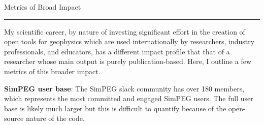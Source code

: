 \documentclass[a4paper, 11pt]{article}
\newcommand{\heading}[1]{
    \begin{minipage}[t]{\textwidth}
    \vspace{0.12cm}
    {\LARGE #1}\\
    \vspace{-0.24cm}
    \hrule
    \end{minipage}
    \vspace{0.05cm}

}
\begin{document}

\heading{Metrics of Broad Impact}

My scientific career, by nature of investing significant effort in the creation of open tools for geophysics which are used internationally by researchers, industry professionals, and educators, has a different impact profile that that of a researcher whose main output is purely publication-based. Here, I outline a few metrics of this broader impact. \vspace{0.3cm}

\textbf{SimPEG user base}: The SimPEG slack community has over 180 members, which represents the most committed and engaged SimPEG users. The full user base is likely much larger but this is difficult to quantify because of the open-source nature of the code. \vspace{0.3cm}

\end{document}
